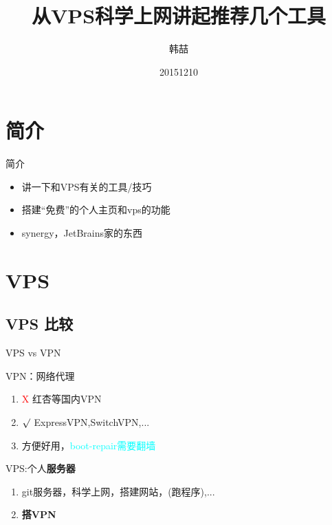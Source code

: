 \documentclass[color=usenames,dvipsnames]{beamer}
\title[VPS]{从VPS科学上网讲起推荐几个工具}
\author{韩喆}
\institute{WIP@ICST}
\date{20151210}
\newcommand{\red}[1]{\textcolor{red}{#1}}
\newcommand{\green}[1]{\textcolor{green}{#1}}
\newcommand{\cyan}[1]{\textcolor{cyan}{#1}}
\begin{document}
\begin{frame}
  \titlepage
\end{frame}


\section{简介}

\begin{frame}{简介}

\begin{itemize}
  \item 讲一下和VPS有关的工具/技巧
  \item 搭建“免费”的个人主页和vps的功能
  \item synergy，JetBrains家的东西
\end{itemize}

\vskip 1cm

\end{frame}

\section{VPS}
\subsection{VPS 比较}

\begin{frame}{VPS vs VPN}
 \begin{block}{VPN：网络代理}
  \begin{enumerate}
   \item \red{X} 红杏等国内VPN
   \item \green{$\surd$} ExpressVPN,SwitchVPN,...
   \item 方便好用，\cyan{boot-repair需要翻墙}
  \end{enumerate}
 \end{block}
 
 \begin{block}{VPS:个人\textbf{服务器}}
  \begin{enumerate}
   \item git服务器，科学上网，搭建网站，(跑程序),...
   \item \textbf{搭VPN}
  \end{enumerate}
 \end{block}
\end{frame}
\end{document}
